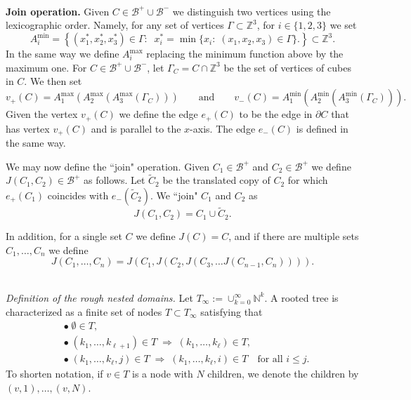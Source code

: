 \documentclass[11pt,reqno]{amsart}
\newcommand{\Z}{{\mathbb Z}}
\theoremstyle{definition}
\begin{document}
\ \\{\bf Join operation.} Given $C \in \mathcal B^+ \cup \mathcal B^-$ we distinguish two vertices using the lexicographic order.  Namely, for any set of vertices $\Gamma \subset \Z^3$, for $i \in \{1,2,3\}$  we  set  
\[A_i^{\min}=\left\{(x_1^*, x_2^*,x_3^*) \in \Gamma: \;\; x_i^*= \min\{x_i: \; (x_1,x_2,x_3) \in \Gamma\}  \big. \right\}\subset \Z^3.\]
In the same way we define $A_i^{\max}$ replacing the minimum function above by the maximum one.
For  $C \in \mathcal B^+ \cup \mathcal B^-$, let $\Gamma_C= C \cap \Z^3$ be the set of vertices of cubes in $C$. We then set
\[ v_+(C)=A_1^{\max}(A_2^{\max}(A_3^{\max}(\Gamma_ C))) \qquad \text{and}\qquad v_-(C)=A_1^{\min}(A_2^{\min}(A_3^{\min}(\Gamma_ C))).\]
Given the vertex $v_+(C)$ we define the edge $e_+(C)$ to be the edge in $\partial C$ that has vertex $v_+(C)$ and is parallel to the $x$-axis. The edge $e_-(C)$ is defined in the same way.


We may now define the ``join" operation. Given $C_1 \in \mathcal B^+$ and $C_2 \in \mathcal B^+$ we define $J(C_1, C_2) \in \mathcal B^+$  as follows. Let $\tilde C_2$ be the translated copy of $C_2$ for which $e_+(C_1)$ coincides with $e_-(\tilde C_2)$.
We ``join" $C_1$ and $C_2$  as
\[J(C_1, C_2) = C_1 \cup \tilde C_2.\]   

In addition, for a single set $C$ we define $J(C)=C$, and if there are multiple sets $C_1, \dots, C_n$ we define \[J(C_1, \dots, C_n)=J(C_1,  J(C_2, J(C_3, \dots J(C_{n-1},C_n)))).\] 




\ \\ \emph {Definition of the rough nested domains.}
Let $T_\infty:= \cup_{k=0}^\infty \mathbb N^k$. A rooted tree is characterized as a finite set of nodes $T \subset T_\infty$ satisfying that
\begin{align*}
&\bullet\; \emptyset \in T, \\
&\bullet\; (k_1, \dots, k_{\ell+1}) \in T \;\Longrightarrow\;  (k_1, \dots, k_{\ell}) \in T, \\
&\bullet\; (k_1, \dots, k_{\ell}, j) \in T \;\Longrightarrow\; (k_1, \dots, k_{\ell}, i) \in T \quad\text{for all $i \leq j$.}
\end{align*}
To shorten notation, if $v \in T$ is a node with $N$ children, we denote the children by $(v,1), \dots, (v,N)$. 
\end{document}
